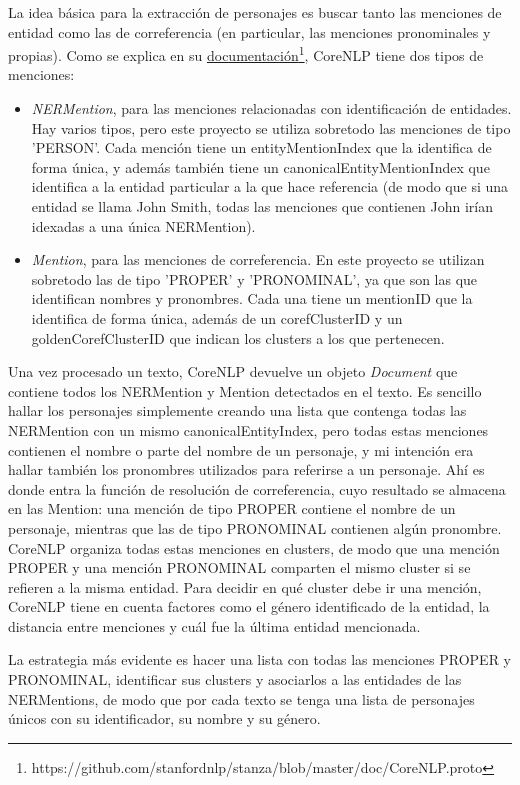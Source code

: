 \documentclass{pre-tfg}
\begin{document}
La idea básica para la extracción de personajes es buscar tanto las menciones de entidad como las de correferencia (en particular, las menciones pronominales y propias).
Como se explica en su \href{https://github.com/stanfordnlp/stanza/blob/master/doc/CoreNLP.proto}{documentación}\footnote{https://github.com/stanfordnlp/stanza/blob/master/doc/CoreNLP.proto}, CoreNLP tiene dos tipos de menciones:
\begin{itemize}
	\item \textit{NERMention}, para las menciones relacionadas con identificación de entidades. Hay varios tipos, pero este proyecto se utiliza sobretodo las menciones de tipo 'PERSON'. Cada mención tiene un entityMentionIndex que la identifica de forma única, y además también tiene un canonicalEntityMentionIndex que identifica a la entidad particular a la que hace referencia (de modo que si una entidad se llama John Smith, todas las menciones que contienen John irían idexadas a una única NERMention).
	\item \textit{Mention}, para las menciones de correferencia. En este proyecto se utilizan sobretodo las de tipo 'PROPER' y 'PRONOMINAL', ya que son las que identifican nombres y pronombres. Cada una tiene un mentionID que la identifica de forma única, además de un corefClusterID y un goldenCorefClusterID que indican los clusters a los que pertenecen.
\end{itemize}

Una vez procesado un texto, CoreNLP devuelve un objeto \textit{Document} que contiene todos los NERMention y Mention detectados en el texto. Es sencillo hallar los personajes simplemente creando una lista que contenga todas las NERMention con un mismo canonicalEntityIndex, pero todas estas menciones contienen el nombre o parte del nombre de un personaje, y mi intención era hallar también los pronombres utilizados para referirse a un personaje. Ahí es donde entra la función de resolución de correferencia, cuyo resultado se almacena en las Mention: una mención de tipo PROPER contiene el nombre de un personaje, mientras que las de tipo PRONOMINAL contienen algún pronombre. CoreNLP organiza todas estas menciones en clusters, de modo que una mención PROPER y una mención PRONOMINAL comparten el mismo cluster si se refieren a la misma entidad. Para decidir en qué cluster debe ir una mención, CoreNLP tiene en cuenta factores como el género identificado de la entidad, la distancia entre menciones y cuál fue la última entidad mencionada.

La estrategia más evidente es hacer una lista con todas las menciones PROPER y PRONOMINAL, identificar sus clusters y asociarlos a las entidades de las NERMentions, de modo que por cada texto se tenga una lista de personajes únicos con su identificador, su nombre y su género.
\end{document}
